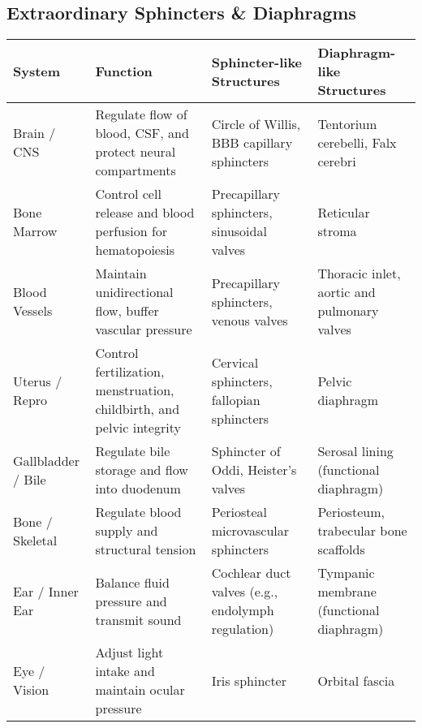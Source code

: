 \documentclass{article}
\begin{document}
\begin{landscape}

\section*{Extraordinary Sphincters \& Diaphragms}

\renewcommand{\arraystretch}{1.5}
\setlength{\tabcolsep}{8pt}

\begin{tabular}{>{\raggedright\arraybackslash}p{4cm} >{\raggedright\arraybackslash}p{6cm} >{\raggedright\arraybackslash}p{5.5cm} >{\raggedright\arraybackslash}p{5.5cm}}
\toprule
\textbf{System} & \textbf{Function} & \textbf{Sphincter-like Structures} & \textbf{Diaphragm-like Structures} \\
\midrule

Brain / CNS & Regulate flow of blood, CSF, and protect neural compartments &
Circle of Willis, BBB capillary sphincters &
Tentorium cerebelli, Falx cerebri \\

Bone Marrow & Control cell release and blood perfusion for hematopoiesis &
Precapillary sphincters, sinusoidal valves &
Reticular stroma \\

Blood Vessels & Maintain unidirectional flow, buffer vascular pressure &
Precapillary sphincters, venous valves &
Thoracic inlet, aortic and pulmonary valves \\

Uterus / Repro & Control fertilization, menstruation, childbirth, and pelvic integrity &
Cervical sphincters, fallopian sphincters &
Pelvic diaphragm \\

Gallbladder / Bile & Regulate bile storage and flow into duodenum &
Sphincter of Oddi, Heister’s valves &
Serosal lining (functional diaphragm) \\

Bone / Skeletal & Regulate blood supply and structural tension &
Periosteal microvascular sphincters &
Periosteum, trabecular bone scaffolds \\

Ear / Inner Ear & Balance fluid pressure and transmit sound &
Cochlear duct valves (e.g., endolymph regulation) &
Tympanic membrane (functional diaphragm) \\

Eye / Vision & Adjust light intake and maintain ocular pressure &
Iris sphincter &
Orbital fascia \\


\end{tabular}
\end{landscape}
\end{document}
